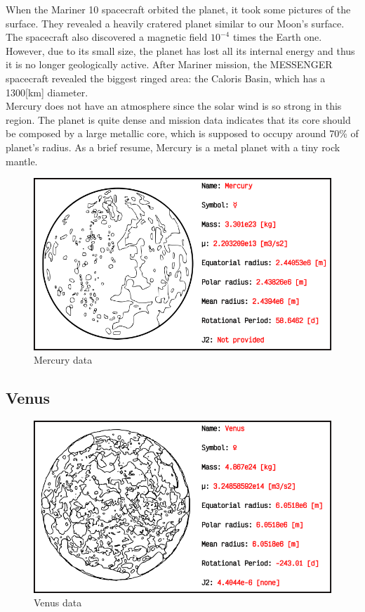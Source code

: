 When the Mariner 10 spacecraft orbited the planet, it took some pictures of the surface. They revealed a heavily cratered planet similar to our Moon's surface. The spacecraft also discovered a magnetic field $10^{-4}$ times the Earth one. However, due to its small size, the planet has lost all its internal energy and thus it is no longer geologically active. After Mariner mission, the MESSENGER spacecraft revealed the biggest ringed area: the Caloris Basin, which has a 1300[km] diameter.\\

Mercury does not have an atmosphere since the solar wind is so strong in this region. The planet is quite dense and mission data indicates that its core should be composed by a large metallic core, which is supposed to occupy around 70\% of planet's radius. As a brief resume, Mercury is a metal planet with a tiny rock mantle.

\begin{figure}[h]
	\centering
	\includegraphics[scale=0.75]{figs/bodies/mercury.png}
	\caption{Mercury data}
\end{figure}

\subsection{Venus}
\begin{figure}[h]
	\centering
	\includegraphics[scale=0.75]{figs/bodies/venus.png}
	\caption{Venus data}
\end{figure}
